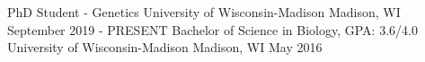 
\begin{cventries}
\cventry
{PhD Student - Genetics} %
{University of Wisconsin-Madison} %
{Madison, WI} %
{September 2019 - PRESENT} %
\cventry
{Bachelor of Science in Biology, GPA: 3.6/4.0} %
{University of Wisconsin-Madison} %
{Madison, WI} %
{May 2016} %
\end{cventries}
